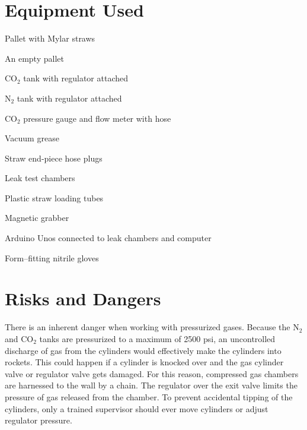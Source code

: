 \documentclass[A4,12pt]{article}
\begin{document}

\section{Equipment Used}
\begin{multicols}{2}
\begin{myitemize}
	\item Pallet with Mylar straws
	\item An empty pallet
	\item CO$_2$ tank with regulator attached
	\item N$_2$ tank with regulator attached
	\item CO$_2$ pressure gauge and flow meter with hose 
	\item Vacuum grease
	\item Straw end-piece hose plugs
	\item Leak test chambers
	\item Plastic straw loading tubes
	\item Magnetic grabber
	\item Arduino Unos connected to leak chambers and computer
	\item Form--fitting nitrile gloves
\end{myitemize}
\end{multicols}


\section{Risks and Dangers}
There is an inherent danger when working with pressurized gases. Because the N$_2$ and CO$_2$ tanks are pressurized to a maximum of 2500 psi, an uncontrolled discharge of gas from the cylinders would effectively make the cylinders into rockets. This could happen if a cylinder is knocked over and the gas cylinder valve or regulator valve gets damaged. For this reason, compressed gas chambers are harnessed to the wall by a chain. The regulator over the exit valve limits the pressure of gas released from the chamber. To prevent accidental tipping of the cylinders, only a trained supervisor should ever move cylinders or adjust regulator pressure. 
\end{document}
